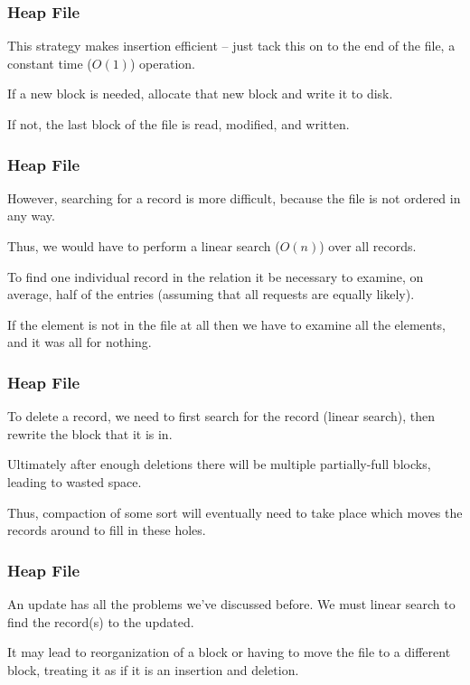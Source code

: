\begin{frame}
\frametitle{Heap File}

This strategy makes insertion efficient -- just tack this on to the end of the file, a constant time ($O(1)$) operation. 

If a new block is needed, allocate that new block and write it to disk. 

If not, the last block of the file is read, modified, and written.

\end{frame}


\begin{frame}
\frametitle{Heap File}
However, searching for a record is more difficult, because the file is not ordered in any way. 

Thus, we would have to perform a linear search ($O(n)$) over all records. 

To find one individual record in the relation it be necessary to examine, on average, half of the entries (assuming that all requests are equally likely).

If the element is not in the file at all then we have to examine all the elements, and it was all for nothing.

\end{frame}



\begin{frame}
\frametitle{Heap File}

To delete a record, we need to first search for the record (linear search), then rewrite the block that it is in. 

Ultimately after enough deletions there will be multiple partially-full blocks, leading to wasted space. 

Thus, compaction of some sort will eventually need to take place which moves the records around to fill in these holes.

\end{frame}


\begin{frame}
\frametitle{Heap File}

An update has all the problems we've discussed before. We must linear search to find the record(s) to the updated. 

It may lead to reorganization of a block or having to move the file to a different block, treating it as if it is an insertion and deletion.  

\end{frame}



